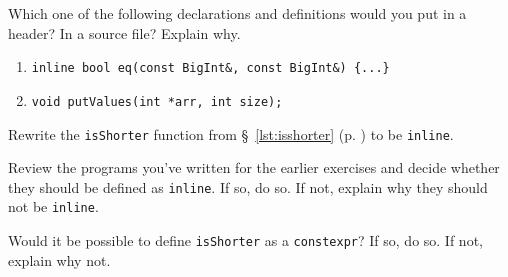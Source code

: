 %
%
\begin{question}
Which one of the following declarations and definitions would
you put in a header? In a source file? Explain why.
\begin{enumerate}[label=(\alph*)]
^^I\item \verb|inline bool eq(const BigInt&, const BigInt&) {...}|
^^I\item \verb|void putValues(int *arr, int size);|
\end{enumerate}
\end{question}

\begin{question}
Rewrite the \verb|isShorter| function from \S~\ref{lst:isshorter} (p. \pageref{lst:isshorter}) to be \verb|inline|.
\end{question}

\begin{question}
Review the programs you’ve written for the earlier exercises
and decide whether they should be defined as \verb|inline|. If so, do so. If not,
explain why they should not be \verb|inline|.
\end{question}

\begin{question}
Would it be possible to define \verb|isShorter| as a \verb|constexpr|?
If so, do so. If not, explain why not.
\end{question}
